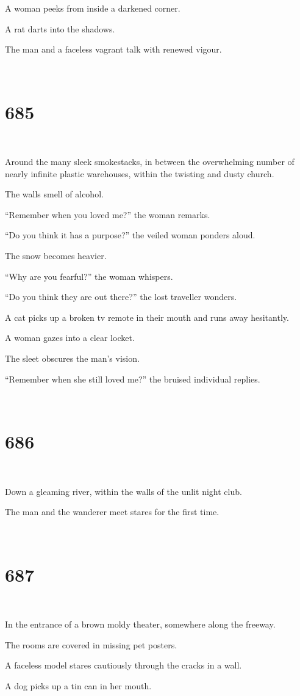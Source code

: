 \documentclass{report}
\begin{document}
A woman peeks from inside a darkened corner.

A rat darts into the shadows.

The man and a faceless vagrant talk with renewed vigour.

~
\chapter*{685}
~

Around the many sleek smokestacks, in between the overwhelming number of nearly infinite plastic warehouses, within the twisting and dusty church.

The walls smell of alcohol.

``Remember when you loved me?'' the woman remarks.

``Do you think it has a purpose?'' the veiled woman ponders aloud.

The snow becomes heavier.

``Why are you fearful?'' the woman whispers.

``Do you think they are out there?'' the lost traveller wonders.

A cat picks up a broken tv remote in their mouth and runs away hesitantly.

A woman gazes into a clear locket.

The sleet obscures the man's vision.

``Remember when she still loved me?'' the bruised individual replies.

~
\chapter*{686}
~

Down a gleaming river, within the walls of the unlit night club.

The man and the wanderer meet stares for the first time.

~
\chapter*{687}
~

In the entrance of a brown moldy theater, somewhere along the freeway.

The rooms are covered in missing pet posters.

A faceless model stares cautiously through the cracks in a wall.

A dog picks up a tin can in her mouth.
\end{document}
